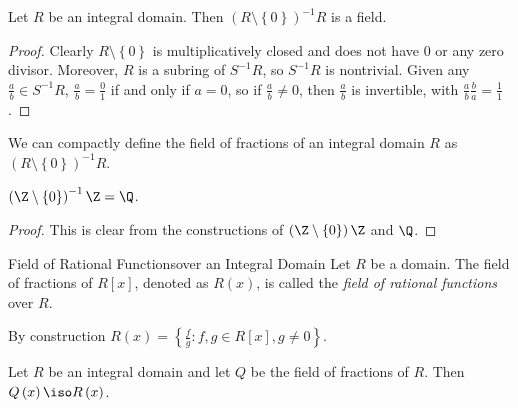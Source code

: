 \documentclass[pmath347]{subfiles}
\begin{document}
    \begin{prop}{}
        Let $R$ be an integral domain. Then $\left( R\setminus \left\lbrace 0 \right\rbrace  \right) ^{-1} R$ is a field.
    \end{prop}

    \begin{proof}
        Clearly $R\setminus \left\lbrace 0 \right\rbrace$ is multiplicatively closed and does not have $0$ or any zero divisor. Moreover, $R$ is a subring of $S^{-1} R$, so $S^{-1} R$ is nontrivial. Given any $\frac{a}{b}\in S^{-1} R$, $\frac{a}{b} = \frac{0}{1}$ if and only if $a=0$, so if $\frac{a}{b}\neq 0$, then $\frac{a}{b}$ is invertible, with $\frac{a}{b}\frac{b}{a} = \frac{1}{1}$.
    \end{proof}

    \noindent We can compactly define the field of fractions of an integral domain $R$ as $\left( R\setminus \left\lbrace 0 \right\rbrace  \right) ^{-1} R$.

    \begin{prop}{}
        $\left( \Z\setminus \left\lbrace 0 \right\rbrace  \right) ^{-1} \Z = \Q$.
    \end{prop}

    \begin{proof}
        This is clear from the constructions of $\left( \Z\setminus \left\lbrace 0 \right\rbrace  \right) \Z$ and $\Q$.
    \end{proof}

    \begin{definition}{Field of Rational Functions}{over an Integral Domain}
        Let $R$ be a domain. The field of fractions of $R\left[ x \right]$, denoted as $R\left( x \right)$, is called the \emph{field of rational functions} over $R$.
    \end{definition}
    
    \noindent By construction $R\left( x \right) = \left\lbrace \frac{f}{g}: f,g\in R\left[ x \right] , g\neq 0 \right\rbrace $.

    \begin{prop}{}
        Let $R$ be an integral domain and let $Q$ be the field of fractions of $R$. Then $Q\left( x \right) \iso R\left( x \right)$. 
    \end{prop}
\end{document}
